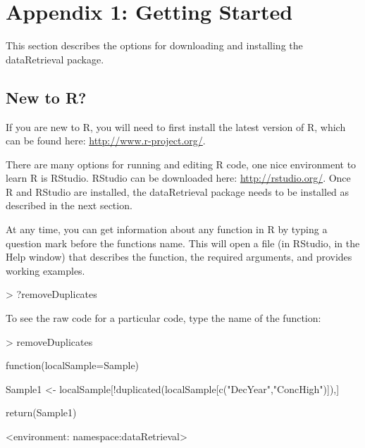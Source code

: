 \documentclass[a4paper,11pt]{article}
\begin{document}
\newpage
\appendix
\section{Appendix 1: Getting Started}
\label{sec:appendix1}
This section describes the options for downloading and installing the dataRetrieval package.

\subsection{New to R?}
If you are new to R, you will need to first install the latest version of R, which can be found here: \url{http://www.r-project.org/}.

There are many options for running and editing R code, one nice environment to learn R is RStudio. RStudio can be downloaded here: \url{http://rstudio.org/}. Once R and RStudio are installed, the dataRetrieval package needs to be installed as described in the next section.

At any time, you can get information about any function in R by typing a question mark before the functions name.  This will open a file (in RStudio, in the Help window) that describes the function, the required arguments, and provides working examples.

\begin{Schunk}
\begin{Sinput}
> ?removeDuplicates
\end{Sinput}
\end{Schunk}

To see the raw code for a particular code, type the name of the function:
\begin{Schunk}
\begin{Sinput}
> removeDuplicates
\end{Sinput}
\begin{Soutput}
function(localSample=Sample) {  
  Sample1 <- localSample[!duplicated(localSample[c("DecYear","ConcHigh")]),]
  
  return(Sample1)
}
<environment: namespace:dataRetrieval>
\end{Soutput}
\end{Schunk}


\end{document}
